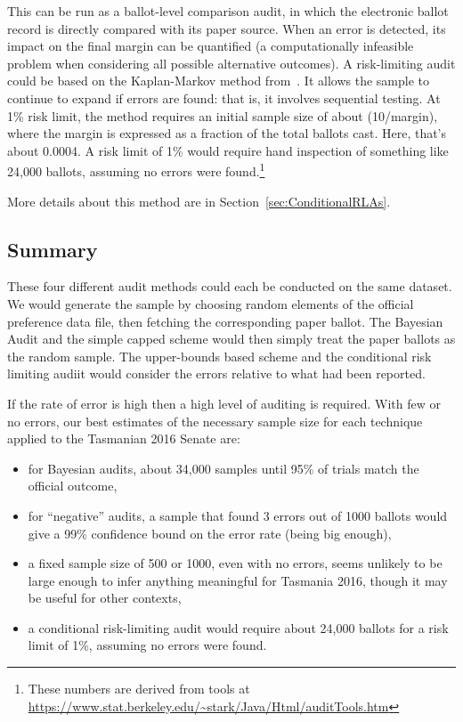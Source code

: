 \documentclass[10pt,a4paper]{article}
\newcommand{\shortVersion}[1]{}
\newcommand{\longVersion}[1]{#1}
\newcommand{\shortVersion}[1]{#1}
\newcommand{\longVersion}[1]{}
\begin{document}
This can be run as a ballot-level comparison audit, in which the electronic ballot record is directly compared with its paper source.  When an error is detected, its impact on the final margin can be quantified  (a computationally infeasible problem when considering all possible alternative outcomes).  
A risk-limiting audit could be based on the Kaplan-Markov  method from~\cite{stark2008conservative}.  It allows the sample to continue to expand if errors are found: that is, it involves sequential testing. 
At 1\% risk limit, the method requires an initial sample size of about (10/margin), where the margin is expressed as a fraction of the total ballots cast. Here, that's about 0.0004.
A risk limit of 1\% would require hand inspection of something like 24,000 ballots, assuming no errors were found.\footnote{These numbers are derived from tools at {\url{https://www.stat.berkeley.edu/~stark/Java/Html/auditTools.htm}} } 

\shortVersion{}\longVersion{More details about this method are in Section~\ref{sec:ConditionalRLAs}.}

\subsection{Summary}
These four different audit methods could each be conducted on the same dataset.  We would generate the sample by choosing random elements of the official preference data file, then fetching the corresponding paper ballot.  The Bayesian Audit and the simple capped scheme would then simply treat the paper ballots as the random sample.  The upper-bounds based scheme and the conditional risk limiting audiit would consider the errors relative to what had been reported.

If the rate of error is high then a high level of auditing is required.  With few or no errors, our best estimates of the necessary sample size for each technique applied to the Tasmanian 2016 Senate are:
\begin{itemize}
	\item for Bayesian audits, about 34,000 samples until 95\% of trials match the official outcome,
	\item for ``negative'' audits, a sample that found 3 errors out of 1000 ballots would give a 99\% confidence bound on the error rate (being big enough),
	\item a fixed sample size of 500 or 1000, even with no errors, seems unlikely to be large enough to infer anything meaningful for Tasmania 2016, though it may be useful for other contexts,
	\item a conditional risk-limiting audit  would require about 24,000 ballots for a risk limit of 1\%, assuming no errors were found.
\end{itemize}
\end{document}
